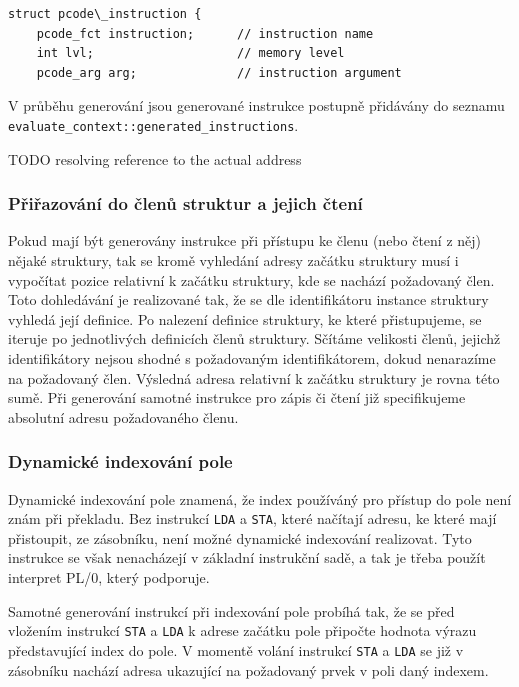 \documentclass[12pt, a4paper]{article}
\begin{document}
\begin{lstlisting}[caption={Struktura \texttt{ast\_node}}, captionpos=b]
struct pcode\_instruction {
    pcode_fct instruction;      // instruction name
    int lvl;                    // memory level
    pcode_arg arg;              // instruction argument
\end{lstlisting}
V průběhu generování jsou generované instrukce postupně přidávány do seznamu \texttt{evaluate\_context::generated\_instructions}. \begin{huge}TODO resolving reference to the actual address \end{huge}

\subsubsection{Přiřazování do členů struktur a jejich čtení}

Pokud mají být generovány instrukce při přístupu ke členu (nebo čtení z něj) nějaké struktury, tak se kromě vyhledání adresy začátku struktury musí i vypočítat pozice relativní k začátku struktury, kde se nachází požadovaný člen. Toto dohledávání je realizované tak, že se dle identifikátoru instance struktury vyhledá její definice. Po nalezení definice struktury, ke které přistupujeme, se iteruje po jednotlivých definicích členů struktury. Sčítáme velikosti členů, jejichž identifikátory nejsou shodné s požadovaným identifikátorem, dokud nenarazíme na požadovaný člen. Výsledná adresa relativní k začátku struktury je rovna této sumě. Při generování samotné instrukce pro zápis či čtení již specifikujeme absolutní adresu požadovaného členu.


\subsubsection{Dynamické indexování pole}

Dynamické indexování pole znamená, že index používáný pro přístup do pole není znám při překladu. Bez instrukcí \texttt{LDA} a \texttt{STA}, které načítají adresu, ke které mají přistoupit, ze zásobníku, není možné dynamické indexování realizovat. Tyto instrukce se však nenacházejí v základní instrukční sadě, a tak je třeba použít interpret PL/0, který podporuje.

Samotné generování instrukcí při indexování pole probíhá tak, že se před vložením instrukcí \texttt{STA} a \texttt{LDA}  k adrese začátku pole připočte hodnota výrazu představující index do pole. V momentě volání instrukcí \texttt{STA} a \texttt{LDA} se již v zásobníku nachází adresa ukazující na požadovaný prvek v poli daný indexem.
\end{document}
